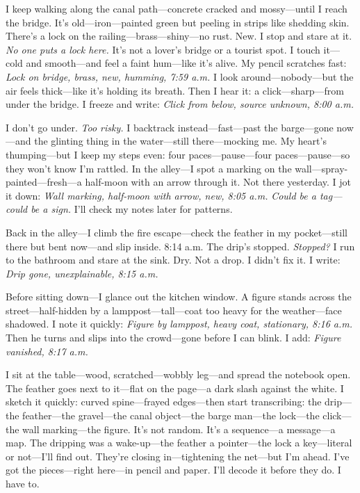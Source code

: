 \documentclass{article}
\begin{document}
I keep walking along the canal path—concrete cracked and mossy—until I reach the bridge. It’s old—iron—painted green but peeling in strips like shedding skin. There’s a lock on the railing—brass—shiny—no rust. New. I stop and stare at it. \textit{No one puts a lock here.} It’s not a lover’s bridge or a tourist spot. I touch it—cold and smooth—and feel a faint hum—like it’s alive. My pencil scratches fast: \textit{Lock on bridge, brass, new, humming, 7:59 a.m.} I look around—nobody—but the air feels thick—like it’s holding its breath. Then I hear it: a click—sharp—from under the bridge. I freeze and write: \textit{Click from below, source unknown, 8:00 a.m.}

I don’t go under. \textit{Too risky.} I backtrack instead—fast—past the barge—gone now—and the glinting thing in the water—still there—mocking me. My heart’s thumping—but I keep my steps even: four paces—pause—four paces—pause—so they won’t know I’m rattled. In the alley—I spot a marking on the wall—spray-painted—fresh—a half-moon with an arrow through it. Not there yesterday. I jot it down: \textit{Wall marking, half-moon with arrow, new, 8:05 a.m.} \textit{Could be a tag—could be a sign.} I’ll check my notes later for patterns.

Back in the alley—I climb the fire escape—check the feather in my pocket—still there but bent now—and slip inside. 8:14 a.m. The drip’s stopped. \textit{Stopped?} I run to the bathroom and stare at the sink. Dry. Not a drop. I didn’t fix it. I write: \textit{Drip gone, unexplainable, 8:15 a.m.}

Before sitting down—I glance out the kitchen window. A figure stands across the street—half-hidden by a lamppost—tall—coat too heavy for the weather—face shadowed. I note it quickly: \textit{Figure by lamppost, heavy coat, stationary, 8:16 a.m.} Then he turns and slips into the crowd—gone before I can blink. I add: \textit{Figure vanished, 8:17 a.m.}

I sit at the table—wood, scratched—wobbly leg—and spread the notebook open. The feather goes next to it—flat on the page—a dark slash against the white. I sketch it quickly: curved spine—frayed edges—then start transcribing: the drip—the feather—the gravel—the canal object—the barge man—the lock—the click—the wall marking—the figure. It’s not random. It’s a sequence—a message—a map. The dripping was a wake-up—the feather a pointer—the lock a key—literal or not—I’ll find out. They’re closing in—tightening the net—but I’m ahead. I’ve got the pieces—right here—in pencil and paper. I’ll decode it before they do. I have to.
\end{document}
